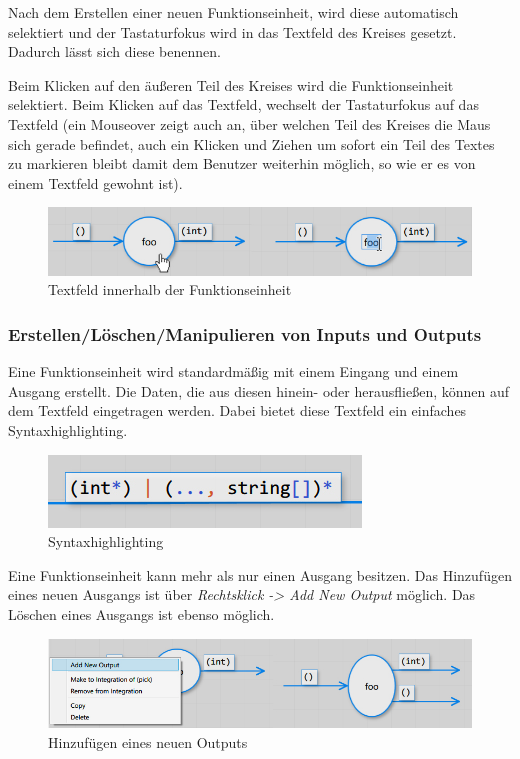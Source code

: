 	
	Nach dem Erstellen einer neuen Funktionseinheit, wird diese automatisch
	selektiert und der Tastaturfokus wird in das Textfeld des Kreises gesetzt.
	Dadurch lässt sich diese benennen.
	
	Beim Klicken auf den äußeren Teil des Kreises wird die Funktionseinheit
	selektiert. Beim Klicken auf das Textfeld, wechselt der Tastaturfokus auf
	das Textfeld (ein Mouseover zeigt auch an, über welchen Teil des Kreises
	die Maus sich gerade befindet, auch ein Klicken und Ziehen um sofort ein Teil
	des Textes zu markieren bleibt damit dem Benutzer weiterhin möglich, so wie er es von
	einem Textfeld gewohnt ist).
	
			\begin{figure}[H]
				\centering
				\includegraphics[width=1\linewidth]{./img/functionUnitCursor.jpg} 
				\caption{Textfeld innerhalb der Funktionseinheit}
			\end{figure}
	
	
\subsubsection{Erstellen/Löschen/Manipulieren von Inputs und Outputs}

	Eine Funktionseinheit wird standardmäßig mit einem Eingang und einem Ausgang
	erstellt. Die Daten, die aus diesen hinein- oder herausfließen, können auf
	dem Textfeld eingetragen werden. Dabei bietet diese Textfeld ein einfaches
	Syntaxhighlighting.
	
		\begin{figure}[H]
			\centering
			\includegraphics[width=0.4\linewidth]{./img/synatxHighlighting.jpg} 
			\caption{Syntaxhighlighting}
		\end{figure}
	
		
	Eine Funktionseinheit kann mehr als nur einen Ausgang besitzen.
	Das Hinzufügen eines neuen Ausgangs ist über \textit{Rechtsklick -> Add New Output} möglich.
	Das Löschen eines Ausgangs ist ebenso möglich.

	\begin{figure}[H]
		\centering
		\includegraphics[width=1\linewidth]{./img/addOutput.jpg} 
		\caption{Hinzufügen eines neuen Outputs}
	\end{figure}



